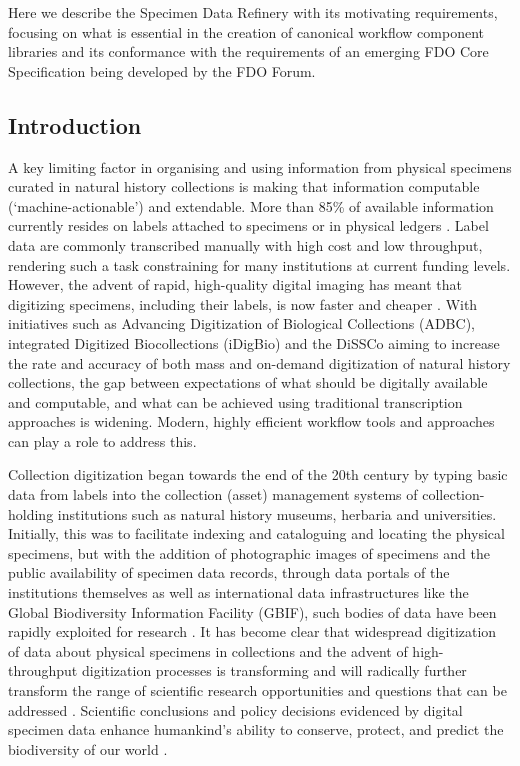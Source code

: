 Here we describe the Specimen Data Refinery with its motivating
requirements, focusing on what is essential in the creation of canonical
workflow component libraries and its conformance with the requirements
of an emerging FDO Core Specification being developed by the FDO Forum.

\subsection{Introduction}\label{introduction-2}

A key limiting factor in organising and using information from physical
specimens curated in natural history collections is making that
information computable (`machine-actionable') and extendable. More than
85\% of available information currently resides on labels attached to
specimens or in physical ledgers \cite{Walton 2020a}. Label data are commonly
transcribed manually with high cost and low throughput, rendering such a
task constraining for many institutions at current funding levels.
However, the advent of rapid, high-quality digital imaging has meant
that digitizing specimens, including their labels, is now faster and
cheaper \cite{Thiers 2016}. With initiatives such as Advancing Digitization of
Biological Collections (ADBC), integrated Digitized Biocollections
(iDigBio) and the 
\acrfull{DiSSCo}
\cite{Nelson 2019a,Nelson 2019b,Addink 2019,Lannom 2020} aiming to increase the rate and accuracy of both mass and
on-demand digitization of natural history collections, the gap between
expectations of what should be digitally available and computable, and
what can be achieved using traditional transcription approaches is
widening. Modern, highly efficient workflow tools and approaches can
play a role to address this.

Collection digitization began towards the end of the 20th century by
typing basic data from labels into the collection (asset) management
systems of collection-holding institutions such as natural history
museums, herbaria and universities. Initially, this was to facilitate
indexing and cataloguing and locating the physical specimens, but with
the addition of photographic images of specimens and the public
availability of specimen data records, through data portals of the
institutions themselves as well as international data infrastructures
like the Global Biodiversity Information Facility (GBIF), such bodies of
data have been rapidly exploited for research \cite{GBIF 2021,Heberling 2021}. It has become
clear that widespread digitization of data about physical specimens in
collections and the advent of high-throughput digitization processes
\cite{Sweeney 2018,Allan 2019,Hereld 2019,Price 2018,Tegelberg 2017} is transforming and will radically further transform the
range of scientific research opportunities and questions that can be
addressed \cite{Heberling 2019,Kharouba 2019}. Scientific conclusions and policy decisions
evidenced by digital specimen data enhance humankind's ability to
conserve, protect, and predict the biodiversity of our world
\cite{Watanabe 2019,Lughadha 2019}.

